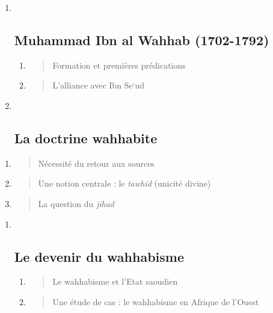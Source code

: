 \begin{enumerate}
\def\labelenumi{\Roman{enumi}.}
\item ~
  \hypertarget{muhammad-ibn-al-wahhab-1702-1792}{%
  \subsection{Muhammad Ibn al Wahhab
  (1702-1792)}\label{muhammad-ibn-al-wahhab-1702-1792}}

  \begin{enumerate}
  \def\labelenumii{\arabic{enumii}.}
  \item
    \begin{quote}
    Formation et premières prédications
    \end{quote}
  \item
    \begin{quote}
    L'alliance avec Ibn Se`ud
    \end{quote}
  \end{enumerate}
\item ~
  \hypertarget{la-doctrine-wahhabite}{%
  \subsection{La doctrine wahhabite}\label{la-doctrine-wahhabite}}
\end{enumerate}

\begin{enumerate}
\def\labelenumi{\arabic{enumi}.}
\setcounter{enumi}{4}
\item
  \begin{quote}
  Nécessité du retour aux sources
  \end{quote}
\item
  \begin{quote}
  Une notion centrale : le \emph{tawhid} (unicité divine)
  \end{quote}
\item
  \begin{quote}
  La question du \emph{jihad}
  \end{quote}
\end{enumerate}

\begin{enumerate}
\def\labelenumi{\Roman{enumi}.}
\setcounter{enumi}{2}
\item ~
  \hypertarget{le-devenir-du-wahhabisme}{%
  \subsection{Le devenir du wahhabisme}\label{le-devenir-du-wahhabisme}}

  \begin{enumerate}
  \def\labelenumii{\arabic{enumii}.}
  \item
    \begin{quote}
    Le wahhabisme et l'Etat saoudien
    \end{quote}
  \item
    \begin{quote}
    Une étude de cas : le wahhabisme en Afrique de l'Ouest
    \end{quote}
  \end{enumerate}
\end{enumerate}

